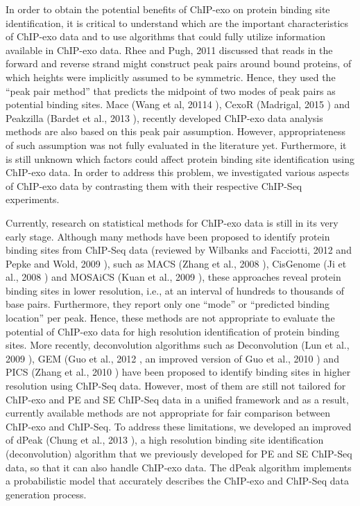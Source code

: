 \documentclass{bmcart}\usepackage[]{graphicx}\usepackage[]{color}
\begin{document}
In order to obtain the potential benefits of ChIP-exo on protein
binding site identification, it is critical to understand which are
the important characteristics of ChIP-exo data and to use algorithms
that could fully utilize information available in ChIP-exo data. Rhee
and Pugh, 2011 \cite{exo1} discussed that reads in the forward and
reverse strand might construct peak pairs around bound proteins, of
which heights were implicitly assumed to be symmetric. Hence, they
used the ``peak pair method'' that predicts the midpoint of two modes
of peak pairs as potential binding sites. Mace (Wang et al, 20114
\cite{mace}), CexoR (Madrigal, 2015 \cite{cexor}) and Peakzilla
(Bardet et al., 2013 \cite{peakzilla}), recently developed ChIP-exo
data analysis methods are also based on this peak pair
assumption. However, appropriateness of such assumption was not fully
evaluated in the literature yet. Furthermore, it is still unknown
which factors could affect protein binding site identification using
ChIP-exo data. In order to address this problem, we investigated
various aspects of ChIP-exo data by contrasting them with their
respective ChIP-Seq experiments.

Currently, research on statistical methods for ChIP-exo data is still
in its very early stage. Although many methods have been proposed to
identify protein binding sites from ChIP-Seq data (reviewed by
Wilbanks and Facciotti, 2012 \cite{evaluation} and Pepke and Wold,
2009 \cite{computation}), such as MACS (Zhang et al., 2008
\cite{macs}), CisGenome (Ji et al., 2008 \cite{cisgenome}) and MOSAiCS
(Kuan et al., 2009 \cite{mosaics}), these approaches reveal protein
binding sites in lower resolution, i.e., at an interval of hundreds to
thousands of base pairs. Furthermore, they report only one ``mode'' or
``predicted binding location'' per peak. Hence, these methods are not
appropriate to evaluate the potential of ChIP-exo data for high
resolution identification of protein binding sites. More recently,
deconvolution algorithms such as Deconvolution (Lun et al., 2009
\cite{csdeconv}), GEM (Guo et al., 2012 \cite{gem}, an improved
version of Guo et al., 2010 \cite{gps} ) and PICS (Zhang et al., 2010
\cite{pics}) have been proposed to identify binding sites in higher
resolution using ChIP-Seq data. However, most of them are still not
tailored for ChIP-exo and PE and SE ChIP-Seq data in a unified
framework and as a result, currently available methods are not
appropriate for fair comparison between ChIP-exo and ChIP-Seq. To
address these limitations, we developed an improved of dPeak (Chung et
al., 2013 \cite{dpeak}), a high resolution binding site identification
(deconvolution) algorithm that we previously developed for PE and SE
ChIP-Seq data, so that it can also handle ChIP-exo data. The dPeak
algorithm implements a probabilistic model that accurately describes
the ChIP-exo and ChIP-Seq data generation process.
\end{document}
